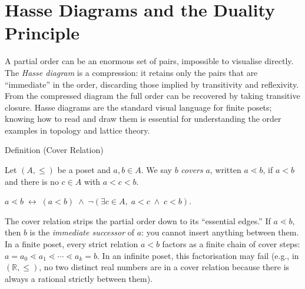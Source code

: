 
\section{Hasse Diagrams and the Duality Principle}\label{sec:hasse-duality}


\begin{exposition}
A partial order can be an enormous set of pairs, impossible to visualise
directly.  The \emph{Hasse diagram} is a compression: it retains only the
pairs that are ``immediate'' in the order, discarding those implied by
transitivity and reflexivity.  From the compressed diagram the full order
can be recovered by taking transitive closure.  Hasse diagrams are the
standard visual language for finite posets; knowing how to read and draw them
is essential for understanding the order examples in topology and lattice theory.
\end{exposition}


\begin{definitionbox}{Definition (Cover Relation)}
\begin{definition}\label{def:cover-relation}
Let $(A, \leq)$ be a poset and $a, b \in A$.  We say $b$ \emph{covers} $a$,
written $a \lessdot b$, if $a < b$ and there is no $c \in A$ with
$a < c < b$.
\end{definition}
\end{definitionbox}\begin{remark*}
$a \lessdot b \;\leftrightarrow\; (a < b) \;\wedge\;
\neg(\exists c \in A,\; a < c \;\wedge\; c < b)$.
\end{remark*}

\begin{remark*}[Intuition]
\label{rem:cover-intuition}
The cover relation strips the partial order down to its ``essential edges.''
If $a \lessdot b$, then $b$ is the \emph{immediate successor} of $a$: you
cannot insert anything between them.  In a finite poset, every strict
relation $a < b$ factors as a finite chain of cover steps:
$a = a_0 \lessdot a_1 \lessdot \cdots \lessdot a_k = b$.  In an infinite
poset, this factorisation may fail (e.g., in $(\mathbb{R}, \leq)$, no two
distinct real numbers are in a cover relation because there is always a
rational strictly between them).
\end{remark*}

